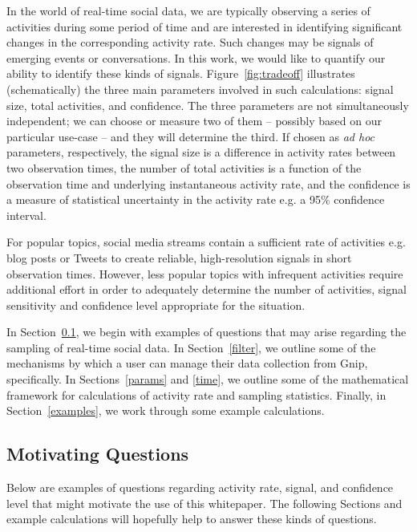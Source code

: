 \documentclass{article}
\begin{document}
In the world of real-time social data, we are typically observing a series of activities during some 
period of time and are interested in identifying significant changes in the corresponding activity 
rate. Such changes may be signals of emerging events or conversations. In this work, 
we would like to quantify our ability to identify these kinds of signals. Figure~\ref{fig:tradeoff} 
illustrates (schematically) the three main parameters involved in such calculations: signal size, total 
activities, and confidence. The three parameters are not simultaneously independent; we can 
choose or measure two of them -- possibly based on our particular use-case -- and they will 
determine the third. If chosen as \emph{ad hoc} parameters, respectively, the signal 
size is a difference in activity rates between two observation times, the number of total 
activities is a function of the observation time and underlying instantaneous activity rate, and the 
confidence is a measure of statistical uncertainty in the activity rate e.g. a 95$\%$ 
confidence interval.

For popular topics, social media streams contain a sufficient rate of activities e.g. blog posts or 
Tweets to create reliable, high-resolution signals in short observation times.  
However, less popular topics with infrequent activities require additional effort in order to adequately 
determine the number of activities, signal sensitivity and confidence level appropriate for the 
situation.

In Section~\ref{Qs}, we begin with examples of questions that may arise regarding 
the sampling of real-time social data. In Section~\ref{filter}, we outline some of the mechanisms 
by which a user can manage their data collection from Gnip, specifically. In Sections~\ref{params} and 
\ref{time}, we outline some of the mathematical framework for calculations 
of activity rate and sampling statistics. Finally, in Section~\ref{examples}, we work 
through some example calculations.



\subsection{Motivating Questions} 
\label{Qs}

Below are examples of questions regarding activity rate, signal, and confidence level that might 
motivate the use of this whitepaper. The following Sections and example calculations will hopefully 
help to answer these kinds of questions.
\end{document}
